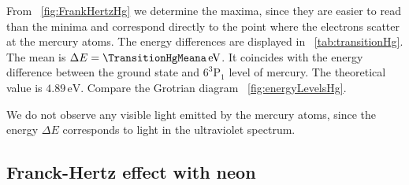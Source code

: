 \documentclass[a4paper,10pt,twocolumn]{article}
\newcommand{\eV}{\, \mathrm{eV}}
\newcommand{\HgLevelA}{6^3\mathrm{P}_1}
\newcommand{\TheoreticalTransitionHga}{4.89}
\begin{document}
    From ~\autoref{fig:FrankHertzHg} we determine the maxima, since they are easier to read than the minima and
    correspond directly to the point where the electrons scatter at the mercury atoms.
    The energy differences are displayed in ~\autoref{tab:transitionHg}.
    The mean is $\Delta E = \TransitionHgMeana \eV$.
    It coincides with the energy difference between the ground state and $\HgLevelA$ level
    of mercury.
    The theoretical value is $\TheoreticalTransitionHga \eV$.
    Compare the Grotrian diagram ~\autoref{fig:energyLevelsHg}.
    
    We do not observe any visible light emitted by the mercury atoms, since the energy $\Delta E$ corresponds to light in the
    ultraviolet spectrum.
    
    
    \subsection{Franck-Hertz effect with neon}
    
\end{document}
